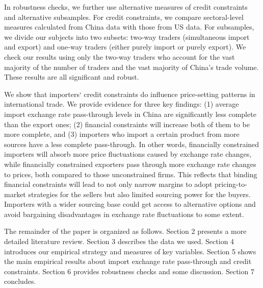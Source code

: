 In robustness checks, we further use alternative measures of credit constraints and alternative subsamples. For credit constraints, we compare sectoral-level measures calculated from China data with those from US data. For subsamples, we divide our subjects into two subsets: two-way traders (simultaneous import and export) and one-way traders (either purely import or purely export). We check our results using only the two-way traders who account for the vast majority of the number of traders and the vast majority of China's trade volume. These results are all significant and robust.

We show that importers‘ credit constraints do influence price-setting patterns in international trade. We provide evidence for three key findings: (1) average import exchange rate pass-through levels in China are significantly less complete than the export ones; (2) financial constraints will increase both of them to be more complete, and (3) importers who import a certain product from more sources have a less complete pass-through. In other words, financially constrained importers will absorb more price fluctuations caused by exchange rate changes, while financially constrained exporters pass through more exchange rate changes to prices, both compared to those unconstrained firms. This reflects that binding financial constraints will lead to not only narrow margins to adopt pricing-to-market strategies for the sellers but also limited sourcing power for the buyers. Importers with a wider sourcing base could get access to alternative options and avoid bargaining disadvantages in exchange rate fluctuations to some extent.

The remainder of the paper is organized as follows. Section 2 presents a more detailed literature review. Section 3 describes the data we used. Section 4 introduces our empirical strategy and measures of key variables. Section 5 shows the main empirical results about import exchange rate pass-through and credit constraints. Section 6 provides robustness checks and some discussion. Section 7 concludes.

\newpage
